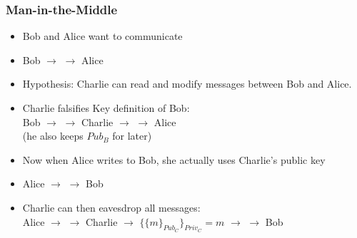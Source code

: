 \documentclass[
hyperref={pdfpagelabels=false}
,xcolor=table
]
{beamer}
\begin{document}
\begin{frame}
  \frametitle{Man-in-the-Middle}

  \begin{itemize}
  \item Bob and Alice want to communicate
  \item Bob $\longrightarrow$  $\longrightarrow$ Alice
  \item Hypothesis: Charlie can read and modify messages between Bob and Alice. 
  \item Charlie falsifies Key definition of Bob: \\
    Bob $\longrightarrow$  $\longrightarrow$ Charlie $\longrightarrow$  $\longrightarrow$ Alice\\
    (he also keeps $Pub_B$ for later)
  \item Now when Alice writes to Bob, she actually uses Charlie's public key
  \item Alice $\longrightarrow$  $\longrightarrow$ Bob
  \item Charlie can then eavesdrop all messages:\\
    Alice $\longrightarrow$  $\longrightarrow$ Charlie $\rightarrow$ $\{\{m\}_{Pub_C}\}_{Priv_C} = m$ $\longrightarrow$  $\longrightarrow$ Bob
  \end{itemize}
  
\end{frame}
\end{document}
